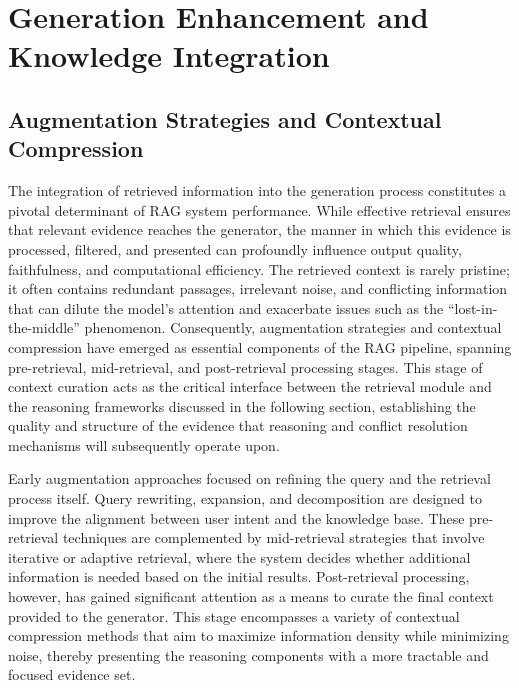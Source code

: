 \documentclass[11pt]{article}
\begin{document}
\section{Generation Enhancement and Knowledge Integration}

\subsection{Augmentation Strategies and Contextual Compression}

The integration of retrieved information into the generation process constitutes a pivotal determinant of RAG system performance. While effective retrieval ensures that relevant evidence reaches the generator, the manner in which this evidence is processed, filtered, and presented can profoundly influence output quality, faithfulness, and computational efficiency. The retrieved context is rarely pristine; it often contains redundant passages, irrelevant noise, and conflicting information that can dilute the model's attention and exacerbate issues such as the ``lost-in-the-middle'' phenomenon. Consequently, augmentation strategies and contextual compression have emerged as essential components of the RAG pipeline, spanning pre-retrieval, mid-retrieval, and post-retrieval processing stages. This stage of context curation acts as the critical interface between the retrieval module and the reasoning frameworks discussed in the following section, establishing the quality and structure of the evidence that reasoning and conflict resolution mechanisms will subsequently operate upon.

Early augmentation approaches focused on refining the query and the retrieval process itself. Query rewriting, expansion, and decomposition are designed to improve the alignment between user intent and the knowledge base. These pre-retrieval techniques are complemented by mid-retrieval strategies that involve iterative or adaptive retrieval, where the system decides whether additional information is needed based on the initial results. Post-retrieval processing, however, has gained significant attention as a means to curate the final context provided to the generator. This stage encompasses a variety of contextual compression methods that aim to maximize information density while minimizing noise, thereby presenting the reasoning components with a more tractable and focused evidence set.
\end{document}
